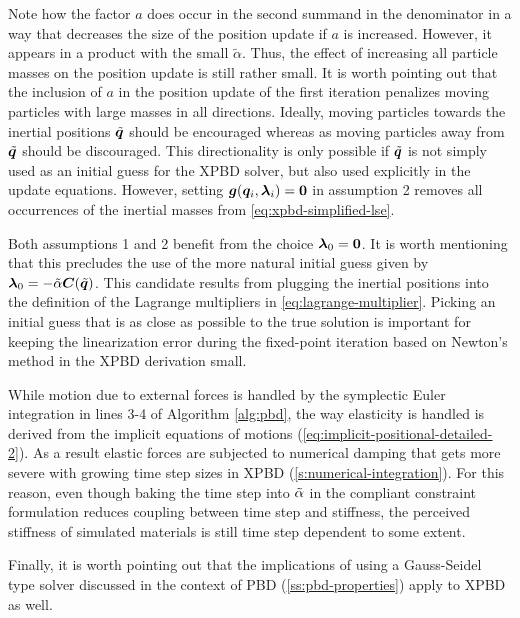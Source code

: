 \noindent Note how the factor $a$ does occur in the second summand in the denominator in a way that decreases the size of the position update
if $a$ is increased. However, it appears in a product with the small $\tilde{\alpha}$. Thus, the effect of increasing all particle masses on
the position update is still rather small. It is worth pointing out that the inclusion of $a$ in the position update of the first iteration
penalizes moving particles with large masses in all directions. Ideally, moving particles towards the inertial positions $\tilde{\bm{q}}$
should be encouraged whereas as moving particles away from $\tilde{\bm{q}}$ should be discouraged. This directionality is only possible if
$\tilde{\bm{q}}$ is not simply used as an initial guess for the XPBD solver, but also used explicitly in the update equations. However, setting
$\bm{g}(\bm{q}_i, \bm{\lambda}_i) = \bm{0}$ in assumption 2 removes all occurrences of the inertial masses from \autoref{eq:xpbd-simplified-lse}.

Both assumptions 1 and 2 benefit from the choice $\bm{\lambda}_0 = \bm{0}$. It is worth mentioning that this precludes the use of the more natural
initial guess given by $\bm{\lambda}_0 = -\tilde{\mathbf{\alpha}} \bm{C}(\tilde{\bm{q}})$. This candidate results from plugging the 
inertial positions into the
definition of the Lagrange multipliers in \autoref{eq:lagrange-multiplier}. Picking an initial guess that is as close as possible to the true
solution is important for keeping the linearization error during the fixed-point iteration based on Newton's method in the XPBD derivation 
small. 

While motion due to external forces is handled by the symplectic Euler integration in lines 3-4 of Algorithm \ref{alg:pbd}, the way 
elasticity is handled is derived from the implicit equations of motions (\cref{eq:implicit-positional-detailed-2}). As a result 
elastic forces are subjected to numerical damping that gets more severe with growing time step sizes in XPBD (\cref{s:numerical-integration}). 
For this reason, even though baking the time step into $\tilde{\mathbf{\alpha}}$ in the compliant constraint formulation reduces coupling 
between time step and stiffness, the perceived stiffness of simulated materials is still time step dependent to some extent.

Finally, it is worth pointing out that the implications of using a Gauss-Seidel type solver discussed in the context of PBD 
(\cref{ss:pbd-properties}) apply to XPBD as well.

